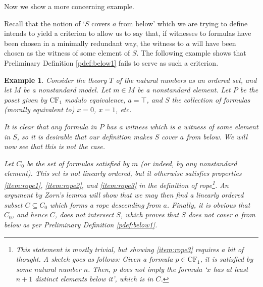 \documentclass{article}
\newtheorem{example}[theorem]{Example}
\theoremstyle{nonumberplain}
\newcommand{\CF}{\mathrm{CF}}
\begin{document}
Now we show a more concerning example.

Recall that the notion of `$S$ covers $a$ from below' which we are trying to define intends to yield a criterion to allow us to say that, if witnesses to formulas have been chosen in a minimally redundant way, the witness to $a$ will have been chosen as the witness of some element of $S$. The following example shows that Preliminary Definition \ref{pdef:below1} fails to serve as such a criterion.

\begin{example}\label{ex:ex2}
Consider the theory $T$ of the natural numbers as an ordered set, and let $M$ be a nonstandard model. Let $m \in M$ be a nonstandard element. Let $P$ be the poset given by $\CF_1$ modulo equivalence, $a = \top$, and $S$ the collection of formulas (morally equivalent to) $x = 0$, $x = 1$, etc.

It is clear that any formula in $P$ has a witness which is a witness of some element in $S$, so it is desirable that our definition makes $S$ cover $a$ from below. We will now see that this is not the case.

Let $C_0$ be the set of formulas satisfied by $m$ (or indeed, by any nonstandard element). This set is not linearly ordered, but it otherwise satisfies properties \ref{item:rope1}, \ref{item:rope2}, and \ref{item:rope3} in the definition of rope\footnote{This statement is mostly trivial, but showing \ref{item:rope3} requires a bit of thought. A sketch goes as follows: Given a formula $p \in \CF_1$, it is satisfied by some natural number $n$. Then, $p$ does not imply the formula `$x$ has at least $n+1$ distinct elements below it', which is in $C$.}. An argument by Zorn's lemma will show that we may then find a linearly ordered subset $C \subseteq C_0$ which forms a rope descending from $a$. Finally, it is obvious that $C_0$, and hence $C$, does not intersect $S$, which proves that $S$ does not cover $a$ from below as per Preliminary Definition \ref{pdef:below1}.
\begin{figure}[H]
\centering
{}
\end{figure}
\end{example}
\end{document}
